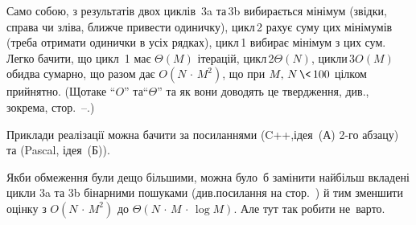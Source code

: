 Само собою, з результатів двох циклів \textnumero$\,$3a та\nolinebreak[3] \textnumero$\,$3b вибирається мінімум (звідки, справа чи зліва, ближче привести одиничку), цикл\nolinebreak[3] \textnumero$\,$2 рахує суму цих мінімумів (треба отримати одинички в усіх рядках), цикл\nolinebreak[3] \textnumero$\,$1 вибирає мінімум з цих сум. 
%
Легко бачити, що цикл \textnumero$\,$1 має $\Theta(M)$ ітерацій, 
цикл\nolinebreak[3] \textnumero$\,$2\nolinebreak[3] $\Theta(N)$, 
цикли\nolinebreak[3] \textnumero$\,$3\nolinebreak[3] $O(M)$ обидва сумарно, 
що разом дає ${O(N\,{\cdot}\,M^2)}$, що при ${M,\,N\,{\<}\,100}$ цілком прийнятно.
(Що\nolinebreak[3] таке ``$O$'' та\nolinebreak[2] ``$\Theta$'' та як вони доводять це твердження, див., зокрема, стор.~\mbox{\pageref{text:asymptotic-defs-begin}--\pageref{text:asymptotic-defs-end}}.)

Приклади реалізації можна бачити за посиланнями  (C++,\nolinebreak[2] ідея~(А) \mbox{2-го} абзацу) та  (Pascal, ідея~(Б)).

Якби обмеження були дещо більшими, можна було~б замінити найбільш вкладені цикли 3a та 3b бінарними пошуками (див.\nolinebreak[3] посилання на стор.~\pageref{text:omnipresent-numbers-binsearch}) й тим зменшити оцінку з ${O(N\,{\cdot}\,M^2)}$ до $\Theta(N\,{\cdot}\,M\,{\cdot}\,\log{}M)$. Але тут так робити не~варто.
